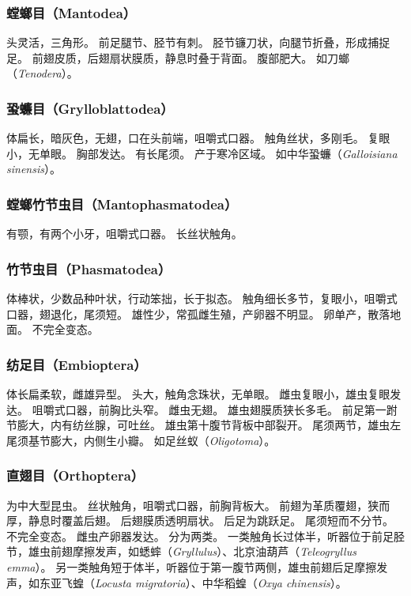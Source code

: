 \documentclass[11pt]{article}
\begin{document}
\subsubsection{螳螂目（Mantodea）}
头灵活，三角形。
前足腿节、胫节有刺。
胫节镰刀状，向腿节折叠，形成捕捉足。
前翅皮质，后翅扇状膜质，静息时叠于背面。
腹部肥大。
如刀螂（\textit{Tenodera}）。

\subsubsection{蛩蠊目（Grylloblattodea）}
体扁长，暗灰色，无翅，口在头前端，咀嚼式口器。
触角丝状，多刚毛。
复眼小，无单眼。
胸部发达。
有长尾须。
产于寒冷区域。
如中华蛩蠊（\textit{Galloisiana sinensis}）。

\subsubsection{螳螂竹节虫目（Mantophasmatodea）}
有颚，有两个小牙，咀嚼式口器。
长丝状触角。

\subsubsection{竹节虫目（Phasmatodea）}
体棒状，少数品种叶状，行动笨拙，长于拟态。
触角细长多节，复眼小，咀嚼式口器，翅退化，尾须短。
雄性少，常孤雌生殖，产卵器不明显。
卵单产，散落地面。
不完全变态。

\subsubsection{纺足目（Embioptera）}
体长扁柔软，雌雄异型。
头大，触角念珠状，无单眼。
雌虫复眼小，雄虫复眼发达。
咀嚼式口器，前胸比头窄。
雌虫无翅。
雄虫翅膜质狭长多毛。
前足第一跗节膨大，内有纺丝腺，可吐丝。
雄虫第十腹节背板中部裂开。
尾须两节，雄虫左尾须基节膨大，内侧生小瓣。
如足丝蚁（\textit{Oligotoma}）。

\subsubsection{直翅目（Orthoptera）}
为中大型昆虫。
丝状触角，咀嚼式口器，前胸背板大。
前翅为革质覆翅，狭而厚，静息时覆盖后翅。
后翅膜质透明扇状。
后足为跳跃足。
尾须短而不分节。
不完全变态。
雌虫产卵器发达。
分为两类。
一类触角长过体半，听器位于前足胫节，雄虫前翅摩擦发声，如蟋蟀（\textit{Gryllulus}）、北京油葫芦（\textit{Teleogryllus emma}）。
另一类触角短于体半，听器位于第一腹节两侧，雄虫前翅后足摩擦发声，如东亚飞蝗（\textit{Locusta migratoria}）、中华稻蝗（\textit{Oxya chinensis}）。
\end{document}
